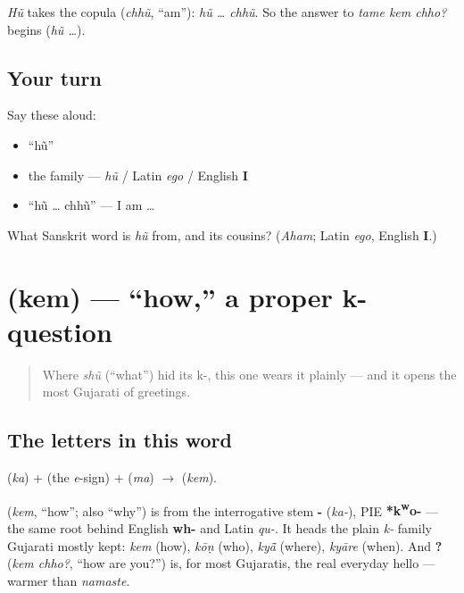 \begin{grammarlens}[title={Grammar Lens: \textquotedblleft{}I\textquotedblright{} plus the copula}]
\emph{Hũ} takes the copula \textbf{} (\emph{chhũ}, \textquotedblleft{}am\textquotedblright{}): \emph{hũ … chhũ}. So the answer to \emph{tame kem chho?} begins \textbf{} (\emph{hũ …}).
\end{grammarlens}

\subsection*{Your turn}
Say these aloud:

\begin{itemize}
\raggedright
  \item \textquotedblleft{}hũ\textquotedblright{}
  \item the family — \emph{hũ} / Latin \emph{ego} / English \textbf{I}
  \item \textquotedblleft{}hũ … chhũ\textquotedblright{} — I am …
\end{itemize}

\begin{tcolorbox}[breakable,colback=teal!4,colframe=teal!35!black,title={Before you move on}]
What Sanskrit word is \emph{hũ} from, and its cousins? (\emph{Aham}; Latin \emph{ego}, English \textbf{I}.)
\end{tcolorbox}
\section[\gu{કેમ}]{ (kem) — \textquotedblleft{}how,\textquotedblright{} a proper k- question}

\label{lesson:GU-C03-kem}



\begin{quote}
Where \emph{shũ} (\textquotedblleft{}what\textquotedblright{}) hid its k-, this one wears it plainly — and it opens the most Gujarati of greetings.
\end{quote}

\subsection*{The letters in this word}
\textbf{} (\emph{ka}) + \textbf{} (the \emph{e}-sign) + \textbf{} (\emph{ma}) $\to$ \textbf{} (\emph{kem}).

\begin{cousinweb}
\textbf{} (\emph{kem}, \textquotedblleft{}how\textquotedblright{}; also \textquotedblleft{}why\textquotedblright{}) is from the interrogative stem \textbf{-} (\emph{ka-}), PIE \textbf{*k\textsuperscript{w}o-} — the same root behind English \textbf{wh-} and Latin \emph{qu-}. It heads the plain \emph{k-} family Gujarati mostly kept: \emph{kem} (how), \emph{kōṇ} (who), \emph{kyā̃} (where), \emph{kyāre} (when). And \textbf{ ?} (\emph{kem chho?}, \textquotedblleft{}how are you?\textquotedblright{}) is, for most Gujaratis, the real everyday hello — warmer than \emph{namaste}.
\end{cousinweb}

